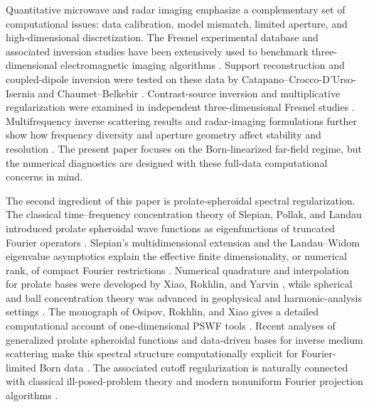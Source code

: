 \documentclass[11pt]{article}
\numberwithin{equation}{section}
\theoremstyle{plain}
\theoremstyle{definition}
\begin{document}
Quantitative microwave and radar imaging emphasize a complementary set of computational issues: data calibration, model mismatch, limited aperture, and high-dimensional discretization.  The Fresnel experimental database and associated inversion studies have been extensively used to benchmark three-dimensional electromagnetic imaging algorithms \cite{GeffrinSabouroux2009,LitmanCrocco2009}.  Support reconstruction and coupled-dipole inversion were tested on these data by Catapano--Crocco-D'Urso-Isernia and Chaumet--Belkebir \cite{CatapanoCroccoDursoIsernia2009,ChaumetBelkebir2009}.  Contrast-source inversion and multiplicative regularization were examined in independent three-dimensional Fresnel studies \cite{LiAbubakarVanDenBerg2009,DeZaeytijdFranchois2009}.  Multifrequency inverse scattering results and radar-imaging formulations further show how frequency diversity and aperture geometry affect stability and resolution \cite{BaoLiLinTriki2015,CheneyBorden2009,AmmariEtAl2013}.  The present paper focuses on the Born-linearized far-field regime, but the numerical diagnostics are designed with these full-data computational concerns in mind.

The second ingredient of this paper is prolate-spheroidal spectral regularization.  The classical time--frequency concentration theory of Slepian, Pollak, and Landau introduced prolate spheroidal wave functions as eigenfunctions of truncated Fourier operators \cite{SlepianPollak1961,LandauPollak1961,LandauPollak1962}.  Slepian's multidimensional extension and the Landau--Widom eigenvalue asymptotics explain the effective finite dimensionality, or numerical rank, of compact Fourier restrictions \cite{Slepian1964,LandauWidom1980}.  Numerical quadrature and interpolation for prolate bases were developed by Xiao, Rokhlin, and Yarvin \cite{XiaoRokhlinYarvin2001}, while spherical and ball concentration theory was advanced in geophysical and harmonic-analysis settings \cite{SimonsDahlenWieczorek2006,KhalidKennedyMcEwen2016}.  The monograph of Osipov, Rokhlin, and Xiao gives a detailed computational account of one-dimensional PSWF tools \cite{OsipovRokhlinXiao2013}.  Recent analyses of generalized prolate spheroidal functions and data-driven bases for inverse medium scattering make this spectral structure computationally explicit for Fourier-limited Born data \cite{Greengard2024,Meng2023}.  The associated cutoff regularization is naturally connected with classical ill-posed-problem theory and modern nonuniform Fourier projection algorithms \cite{TikhonovArsenin1977,Hansen2010,BarnettMaglandAfKlinteberg2019}.
\end{document}
